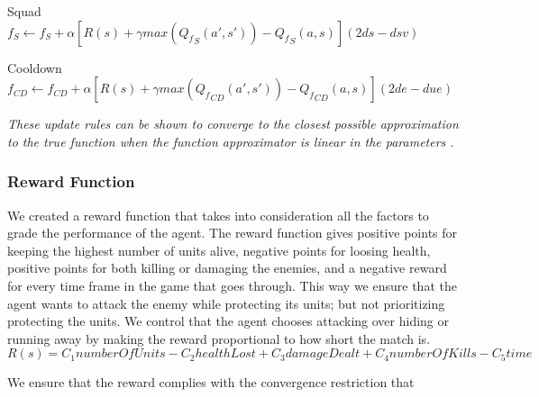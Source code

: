 \begin{flushleft}
Squad  \\ 
$f_{S}  \leftarrow f_{S}  + \alpha [ R(s) + \gamma max({Q_f}_{S} (a',s'))-{Q_f}_{S} (a,s) ] (2ds - dsv)$
\end{flushleft} 

\begin{flushleft}
Cooldown  \\ 
$f_{CD}  \leftarrow f_{CD}  + \alpha [ R(s) + \gamma max({Q_f}_{CD} (a',s'))-{Q_f}_{CD} (a,s) ](2de - due)$ 
\end{flushleft} 



\textit{These update rules can be shown to converge to the closest possible approximation to the true function when the function approximator is linear in the parameters \cite[p779]{rl}. }


\subsubsection{Reward Function}

We created a reward function that takes into consideration all the factors to grade the performance of the agent. The reward function gives positive points for keeping the highest number of units alive, negative points for loosing health, positive points for both killing or damaging the enemies, and a negative reward for every time frame in the game that goes through. This way we ensure that the agent wants to attack the enemy while protecting its units; but not prioritizing protecting the units. We control that the agent chooses attacking over hiding or running away by making the reward proportional to how short the match is. \\ 

$R(s) = C_1 numberOfUnits  -  C_2 healthLost  +   C_3 damageDealt  +   C_4 numberOfKills -  C_5 time$

We ensure that the reward complies with the convergence restriction that





